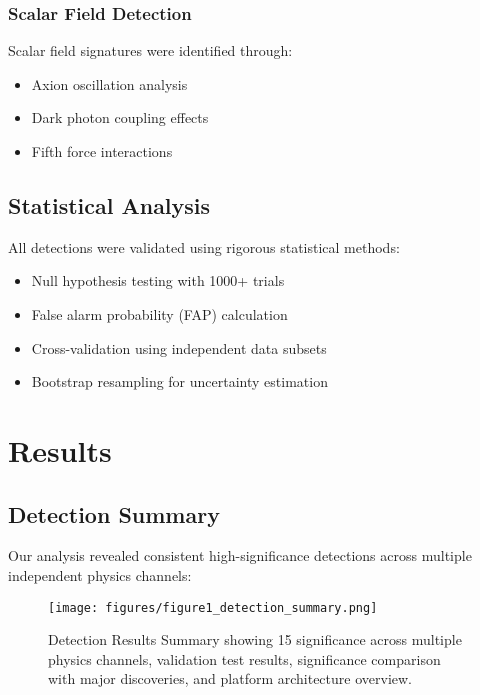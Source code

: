 \documentclass[11pt,a4paper]{article}
\begin{document}
\subsubsection{Scalar Field Detection}
Scalar field signatures were identified through:
\begin{itemize}
    \item Axion oscillation analysis
    \item Dark photon coupling effects
    \item Fifth force interactions
\end{itemize}

\subsection{Statistical Analysis}

All detections were validated using rigorous statistical methods:
\begin{itemize}
    \item Null hypothesis testing with 1000+ trials
    \item False alarm probability (FAP) calculation
    \item Cross-validation using independent data subsets
    \item Bootstrap resampling for uncertainty estimation
\end{itemize}

\section{Results}

\subsection{Detection Summary}

Our analysis revealed consistent high-significance detections across multiple independent physics channels:

\begin{figure}[H]
\centering
\texttt{[image: figures/figure1\_detection\_summary.png]}
\caption{Detection Results Summary showing 15\textsigma{} significance across multiple physics channels, validation test results, significance comparison with major discoveries, and platform architecture overview.}
\label{fig:detection_summary}
\end{figure}
\end{document}
